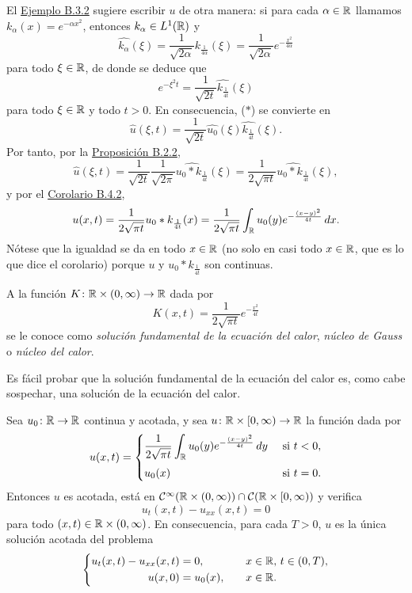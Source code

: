 \documentclass[a4paper, 12pt, extrafontsizes]{memoir}
\begin{document}
El \hyperref[eje:B.3.2]{\color{gray}Ejemplo B.3.2} sugiere escribir $u$ de otra manera: si para cada $\alpha \in \mathbb R$ llamamos $k_\alpha(x)=e^{-\alpha x^2}$, entonces $k_\alpha \in L^1(\mathbb R)$ y
\[\widehat{k_\alpha}(\xi )  = \frac{1}{\sqrt{2\alpha}}k_{\frac{1}{4\alpha}}(\xi) = \frac{1}{\sqrt{2\alpha}}e^{-\frac{x^2}{4\alpha}}\]
para todo $\xi \in \mathbb R$, de donde se deduce que
\[e^{-\xi^2t} = \frac{1}{\sqrt{2t}}\widehat{k_{\frac{1}{4t}}}(\xi)\]
para todo $\xi \in \mathbb R$ y todo $t > 0$. En consecuencia, ($\ast$) se convierte en
\[\widehat{u}(\xi,t) = \frac{1}{\sqrt{2t}}\widehat{u_0}(\xi)\widehat{k_{\frac{1}{4t}}}(\xi).\]
Por tanto, por la \hyperref[pro:B.2.2]{\color{gray}Proposición B.2.2},
\[\widehat{u}(\xi,t) = \frac{1}{\sqrt{2t}}\frac{1}{\sqrt{2\pi}}\widehat{u_0 \ast k_{\frac{1}{4t}}}(\xi) =  \frac{1}{2\sqrt{\pi t}}\widehat{u_0 \ast k_{\frac{1}{4t}}}(\xi),\]
y por el \hyperref[cor:B.4.2]{\color{gray}Corolario B.4.2},
\[u(x,t) = \frac{1}{2\sqrt{\pi t}}u_0 \ast k_{\frac{1}{4t}}(x) = \frac{1}{2\sqrt{\pi t}} \int_\mathbb R u_0(y)e^{-\frac{(x-y)^2}{4t}} \, dx.\]
Nótese que la igualdad se da en todo $x \in \mathbb R$ (no solo en casi todo $x \in \mathbb R$, que es lo que dice el corolario) porque $u$ y $u_0 \ast k_{\frac{1}{4t}}$ son continuas.

\begin{definition}
    A la función $K \colon \mathbb R \times (0,\infty) \to \mathbb R$ dada por
    \[K(x,t) = \frac{1}{2\sqrt{\pi t}}e^{-\frac{x^2}{4t}}\]
    se le conoce como \emph{solución fundamental de la ecuación del calor}, \emph{núcleo de Gauss} o \emph{núcleo del calor}.
\end{definition}

Es fácil probar que la solución fundamental de la ecuación del calor es, como cabe sospechar, una solución de la ecuación del calor.

\begin{theorem}
    Sea $u_0 \colon \mathbb R \to \mathbb R$ continua y acotada, y sea $u \colon \mathbb R \times [0,\infty) \to \mathbb R$ la función dada por
    \[u(x,t) = \begin{cases}
        \displaystyle \frac{1}{2\sqrt{\pi t}} \int_\R u_0(y)e^{-\frac{(x-y)^2}{4t}} \, dy & $ si $ t < 0, \\[10pt]
        u_0(x) & $ si $ t = 0.
    \end{cases}\] 
    Entonces $u$ es acotada, está en $\mathcal{C}^\infty(\mathbb R \times (0,\infty)) \cap \mathcal{C}(\mathbb R \times [0,\infty))$ y verifica 
    \[u_t(x,t)-u_{xx}(x,t) = 0\]
    para todo $(x,t) \in \mathbb R \times (0,\infty)$.
    En consecuencia, para cada $T > 0$, $u$ es la única solución acotada del problema
\[
    \left\{\begin{alignedat}{5}
        u_{t}(x,t)-u_{xx}(x,t) &= 0, \qquad & x &\in \R, \ & t &\in (0,T), \\
        u(x,0) &= u_0(x), \qquad & x &\in \R. & & \\
    \end{alignedat}\right.
\]
\end{theorem}
\end{document}
